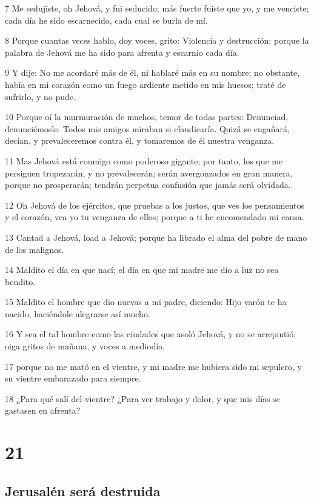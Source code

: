 \par 7 Me sedujiste, oh Jehová, y fui seducido; más fuerte fuiste que yo, y me venciste; cada día he sido escarnecido, cada cual se burla de mí.
\par 8 Porque cuantas veces hablo, doy voces, grito: Violencia y destrucción; porque la palabra de Jehová me ha sido para afrenta y escarnio cada día.
\par 9 Y dije: No me acordaré más de él, ni hablaré más en su nombre; no obstante, había en mi corazón como un fuego ardiente metido en mis huesos; traté de sufrirlo, y no pude.
\par 10 Porque oí la murmuración de muchos, temor de todas partes: Denunciad, denunciémosle. Todos mis amigos miraban si claudicaría. Quizá se engañará, decían, y prevaleceremos contra él, y tomaremos de él nuestra venganza.
\par 11 Mas Jehová está conmigo como poderoso gigante; por tanto, los que me persiguen tropezarán, y no prevalecerán; serán avergonzados en gran manera, porque no prosperarán; tendrán perpetua confusión que jamás será olvidada.
\par 12 Oh Jehová de los ejércitos, que pruebas a los justos, que ves los pensamientos y el corazón, vea yo tu venganza de ellos; porque a ti he encomendado mi causa.
\par 13 Cantad a Jehová, load a Jehová; porque ha librado el alma del pobre de mano de los malignos.
\par 14 Maldito el día en que nací; el día en que mi madre me dio a luz no sea bendito.
\par 15 Maldito el hombre que dio nuevas a mi padre, diciendo: Hijo varón te ha nacido, haciéndole alegrarse así mucho.
\par 16 Y sea el tal hombre como las ciudades que asoló Jehová, y no se arrepintió; oiga gritos de mañana, y voces a mediodía,
\par 17 porque no me mató en el vientre, y mi madre me hubiera sido mi sepulcro, y su vientre embarazado para siempre.
\par 18 ¿Para qué salí del vientre? ¿Para ver trabajo y dolor, y que mis días se gastasen en afrenta?

\chapter{21}

\section*{Jerusalén será destruida}

